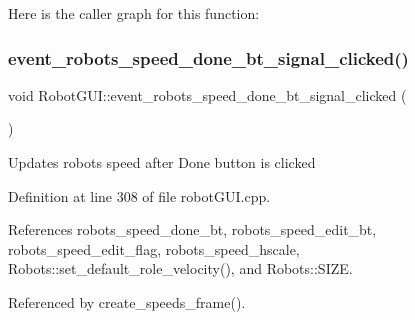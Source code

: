 Here is the caller graph for this function\+:
\mbox{\label{class_robot_g_u_i_a7acb7bdc8533f946f2cbea74966147cc}} 
\subsubsection{\texorpdfstring{event\+\_\+robots\+\_\+speed\+\_\+done\+\_\+bt\+\_\+signal\+\_\+clicked()}{event\_robots\_speed\_done\_bt\_signal\_clicked()}}
{\footnotesize\ttfamily void Robot\+G\+U\+I\+::event\+\_\+robots\+\_\+speed\+\_\+done\+\_\+bt\+\_\+signal\+\_\+clicked (\begin{DoxyParamCaption}{ }\end{DoxyParamCaption})\hspace{0.3cm}{\ttfamily [private]}}

Updates robot\textquotesingle{}s speed after Done button is clicked 

Definition at line 308 of file robot\+G\+U\+I.\+cpp.



References robots\+\_\+speed\+\_\+done\+\_\+bt, robots\+\_\+speed\+\_\+edit\+\_\+bt, robots\+\_\+speed\+\_\+edit\+\_\+flag, robots\+\_\+speed\+\_\+hscale, Robots\+::set\+\_\+default\+\_\+role\+\_\+velocity(), and Robots\+::\+S\+I\+ZE.



Referenced by create\+\_\+speeds\+\_\+frame().


